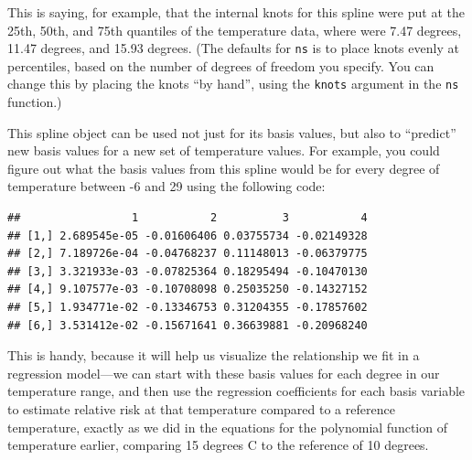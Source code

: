 \documentclass[
]{book}
\newenvironment{Shaded}{\begin{snugshade}}{\end{snugshade}}
\newcommand{\AttributeTok}[1]{\textcolor[rgb]{0.13,0.29,0.53}{#1}}
\newcommand{\DecValTok}[1]{\textcolor[rgb]{0.00,0.00,0.81}{#1}}
\newcommand{\FunctionTok}[1]{\textcolor[rgb]{0.13,0.29,0.53}{\textbf{#1}}}
\newcommand{\NormalTok}[1]{#1}
\newcommand{\OtherTok}[1]{\textcolor[rgb]{0.56,0.35,0.01}{#1}}
\newcommand{\SpecialCharTok}[1]{\textcolor[rgb]{0.81,0.36,0.00}{\textbf{#1}}}
\begin{document}
This is saying, for example, that the internal knots for this spline were put at the
25th, 50th, and 75th quantiles of the temperature data, where were 7.47 degrees, 11.47 degrees,
and 15.93 degrees. (The defaults for \texttt{ns} is to place knots evenly at percentiles, based
on the number of degrees of freedom you specify. You can change this by placing the knots
``by hand'', using the \texttt{knots} argument in the \texttt{ns} function.)

This spline object can be used not just for its basis values, but also to ``predict'' new
basis values for a new set of temperature values. For example, you could figure out
what the basis values from this spline would be for every degree of temperature between
-6 and 29 using the following code:

\begin{Shaded}
\end{Shaded}

\begin{verbatim}
##                 1           2          3           4
## [1,] 2.689545e-05 -0.01606406 0.03755734 -0.02149328
## [2,] 7.189726e-04 -0.04768237 0.11148013 -0.06379775
## [3,] 3.321933e-03 -0.07825364 0.18295494 -0.10470130
## [4,] 9.107577e-03 -0.10708098 0.25035250 -0.14327152
## [5,] 1.934771e-02 -0.13346753 0.31204355 -0.17857602
## [6,] 3.531412e-02 -0.15671641 0.36639881 -0.20968240
\end{verbatim}

This is handy, because it will help us visualize the relationship we fit in a regression
model---we can start with these basis values for each degree in our temperature range, and
then use the regression coefficients for each basis variable to estimate relative risk
at that temperature compared to a reference temperature, exactly as we did in the equations
for the polynomial function of temperature earlier, comparing 15 degrees C to the reference
of 10 degrees.
\end{document}
